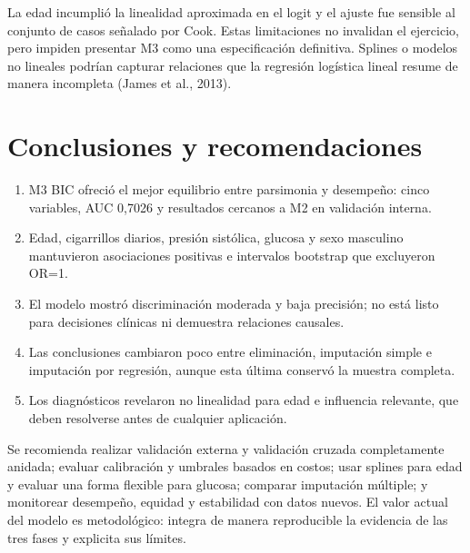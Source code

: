 \documentclass[10pt,a4paper]{article}
\begin{document}
La edad incumplió la linealidad aproximada en el logit y el ajuste fue sensible al conjunto de casos señalado por Cook. Estas limitaciones no invalidan el ejercicio, pero impiden presentar M3 como una especificación definitiva. Splines o modelos no lineales podrían capturar relaciones que la regresión logística lineal resume de manera incompleta (James et al., 2013).

\section{Conclusiones y recomendaciones}

\begin{enumerate}
\item M3 BIC ofreció el mejor equilibrio entre parsimonia y desempeño: cinco variables, AUC 0,7026 y resultados cercanos a M2 en validación interna.
\item Edad, cigarrillos diarios, presión sistólica, glucosa y sexo masculino mantuvieron asociaciones positivas e intervalos bootstrap que excluyeron OR=1.
\item El modelo mostró discriminación moderada y baja precisión; no está listo para decisiones clínicas ni demuestra relaciones causales.
\item Las conclusiones cambiaron poco entre eliminación, imputación simple e imputación por regresión, aunque esta última conservó la muestra completa.
\item Los diagnósticos revelaron no linealidad para edad e influencia relevante, que deben resolverse antes de cualquier aplicación.
\end{enumerate}

Se recomienda realizar validación externa y validación cruzada completamente anidada; evaluar calibración y umbrales basados en costos; usar splines para edad y evaluar una forma flexible para glucosa; comparar imputación múltiple; y monitorear desempeño, equidad y estabilidad con datos nuevos. El valor actual del modelo es metodológico: integra de manera reproducible la evidencia de las tres fases y explicita sus límites.
\end{document}
